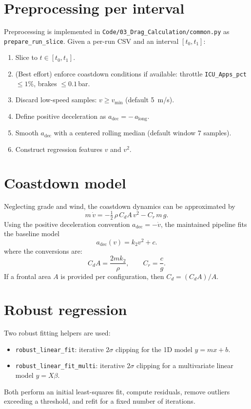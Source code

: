 \documentclass[11pt,a4paper]{article}
\begin{document}
\section{Preprocessing per interval}
Preprocessing is implemented in \texttt{Code/03\_Drag\_Calculation/common.py} as \texttt{prepare\_run\_slice}.
Given a per-run CSV and an interval $[t_0,t_1]$:
\begin{enumerate}
  \item Slice to \(t\in[t_0,t_1]\).
  \item (Best effort) enforce coastdown conditions if available:
    throttle \texttt{ICU\_Apps\_pct} $\le 1\%$, brakes $\le 0.1$\,bar.
  \item Discard low-speed samples: \(v \ge v_\mathrm{min}\) (default \SI{5}{m/s}).
  \item Define positive deceleration as \(a_\mathrm{dec} = -\,a_\mathrm{long}\).
  \item Smooth \(a_\mathrm{dec}\) with a centered rolling median (default window 7 samples).
  \item Construct regression features \(v\) and \(v^2\).
\end{enumerate}

\section{Coastdown model}
Neglecting grade and wind, the coastdown dynamics can be approximated by
\[
  m\,\dot v = -\tfrac{1}{2}\,\rho\,C_dA\,v^2 - C_r\,m\,g.
\]
Using the positive deceleration convention \(a_\mathrm{dec}=-\dot v\), the maintained pipeline fits the baseline model
\[
  a_\mathrm{dec}(v) = k_2 v^2 + c.
\]
where the conversions are:
\[
  C_dA = \frac{2 m k_2}{\rho}, \qquad C_r = \frac{c}{g}.
\]
If a frontal area $A$ is provided per configuration, then \(C_d = (C_dA)/A\).

\section{Robust regression}
Two robust fitting helpers are used:
\begin{itemize}
  \item \texttt{robust\_linear\_fit}: iterative $2\sigma$ clipping for the 1D model \(y=m x + b\).
  \item \texttt{robust\_linear\_fit\_multi}: iterative $2\sigma$ clipping for a multivariate linear model \(y=X\beta\).
\end{itemize}
Both perform an initial least-squares fit, compute residuals, remove outliers exceeding a threshold, and refit for a fixed number of iterations.
\end{document}
